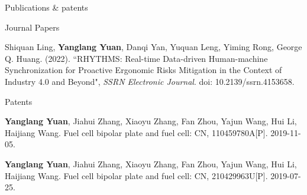 \documentclass{resume} %
\begin{document}
\begin{rSection}{Publications \& patents}

    \begin{rSubsection}{Journal Papers}{}{}{}

        \item Shiquan Ling,{ \textbf{Yanglang Yuan}, Danqi Yan, Yuquan Leng, Yiming Rong, George Q. Huang. (2022). “RHYTHMS: Real-time Data-driven Human-machine Synchronization for Proactive Ergonomic Risks Mitigation in the Context of Industry 4.0 and Beyond", \textit{SSRN Electronic Journal}}. doi: 10.2139/ssrn.4153658.  \\
        \vspace{-10pt}
    \end{rSubsection}




       \begin{rSubsection}{Patents}{}{}{}
       \item { \textbf{Yanglang Yuan}, Jiahui Zhang, Xiaoyu Zhang, Fan Zhou, Yajun Wang, Hui Li, Haijiang Wang. Fuel cell bipolar plate and fuel cell: CN, 110459780A[P]. 2019-11-05.}
       \vspace{2pt}
       
       \item { \textbf{Yanglang Yuan}, Jiahui Zhang, Xiaoyu Zhang, Fan Zhou, Yajun Wang, Hui Li, Haijiang Wang. Fuel cell bipolar plate and fuel cell: CN, 210429963U[P]. 2019-07-25.}
       
       
       \end{rSubsection} 
    
            
\end{rSection}
\end{document}
